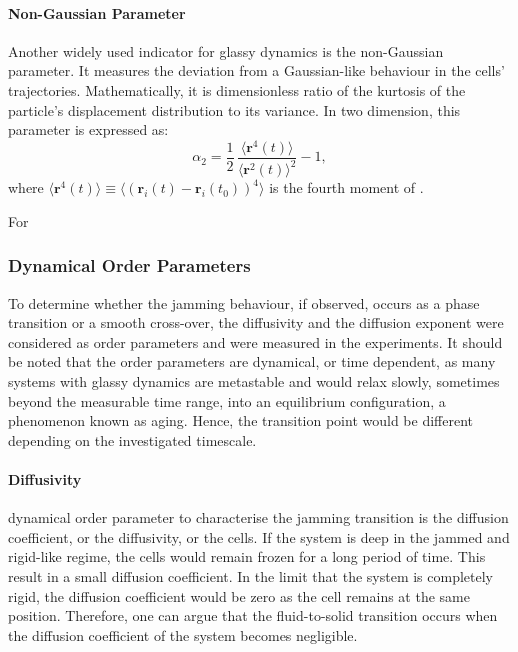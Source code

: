 \documentclass[a4paper,12pt]{article}
\begin{document}
\paragraph{Non-Gaussian Parameter}
Another widely used indicator for glassy dynamics is the non-Gaussian parameter. It measures the deviation from a Gaussian-like behaviour in the cells' trajectories. Mathematically, it is dimensionless ratio of the kurtosis of the particle's displacement distribution to its variance. In two dimension, this parameter is expressed as:
\begin{equation}
\alpha_2 = \frac{1}{2}\,\frac{\langle{\bm{r}^4(t)\rangle}}{\langle{\bm{r}^2(t)\rangle}^2} - 1,
\end{equation}
where $\langle{\bm{r}^4(t)\rangle} \equiv \langle{\left(\bm{r}_i(t) - \bm{r}_i(t_0)\right)^4\rangle}$ is the fourth moment of . 

For 

\subsubsection{Dynamical Order Parameters}
To determine whether the jamming behaviour, if observed, occurs as a phase transition or a smooth cross-over, the diffusivity and the diffusion exponent were considered as order parameters and were measured in the experiments. It should be noted that the order parameters are dynamical, or time dependent, as many systems with glassy dynamics are metastable and would relax slowly, sometimes beyond the measurable time range, into an equilibrium configuration, a phenomenon known as aging. Hence, the transition point would be different depending on the investigated timescale.


\paragraph{Diffusivity}
 dynamical order parameter to characterise the jamming transition is the diffusion coefficient, or the diffusivity, or the cells. If the system is deep in the jammed and rigid-like regime, the cells would remain frozen for a long period of time. This result in a small diffusion coefficient. In the limit that the system is completely rigid, the diffusion coefficient would be zero as the cell remains at the same position. Therefore, one can argue that the fluid-to-solid transition occurs when the diffusion coefficient of the system becomes negligible. 
 
\end{document}
